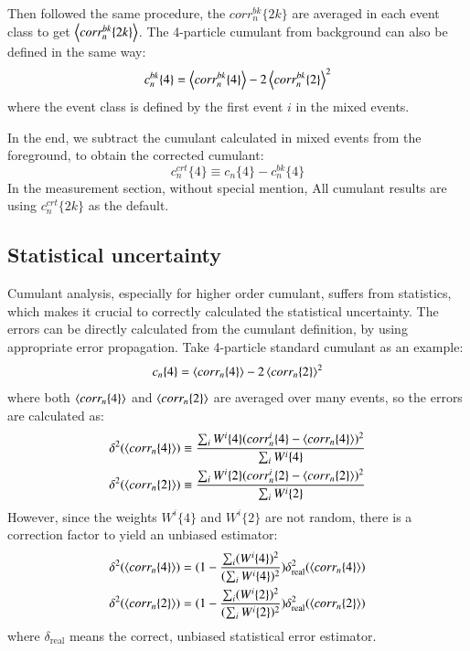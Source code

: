 Then followed the same procedure, the $corr_n^{bk}\{2k\}$ are averaged in each event class to get $\left\langle corr_n^{bk}\{2k\}\right\rangle$. The 4-particle cumulant from background can also be defined in the same way:
\begin{equation}
c_{n}^{bk}\{4\}=\left\langle corr_n^{bk}\{4\}\right\rangle-2\left\langle corr_n^{bk}\{2\}\right\rangle^2
\end{equation}
where the event class is defined by the first event $i$ in the mixed events.

In the end, we subtract the cumulant calculated in mixed events from the foreground, to obtain the corrected cumulant:
\begin{equation}
c_{n}^{crt}\{4\}\equiv c_{n}\{4\}-c_{n}^{bk}\{4\}
\end{equation}
In the measurement section, without special mention, All cumulant results are using $c_{n}^{crt}\{2k\}$ as the default.



\subsection{Statistical uncertainty}
Cumulant analysis, especially for higher order cumulant, suffers from statistics, which makes it crucial to correctly calculated the statistical uncertainty. The errors can be directly calculated from the cumulant definition, by using appropriate error propagation. Take 4-particle standard cumulant as an example:
\begin{equation}
c_n\{4\}=\left\langle corr_n\{4\}\right\rangle-2\left\langle corr_n\{2\}\right\rangle^2
\end{equation}
where both $\left\langle corr_n\{4\}\right\rangle$ and $\left\langle corr_n\{2\}\right\rangle$ are averaged over many events, so the errors are calculated as:
\begin{equation}
\begin{split}
\delta^2(\left\langle corr_n\{4\}\right\rangle)&\equiv \frac{\sum_i W^i\{4\}(corr_n^i\{4\}-\left\langle corr_n\{4\}\right\rangle)^2}{\sum_i W^i\{4\}} \\
\delta^2(\left\langle corr_n\{2\}\right\rangle)&\equiv \frac{\sum_i W^i\{2\}(corr_n^i\{2\}-\left\langle corr_n\{2\}\right\rangle)^2}{\sum_i W^i\{2\}}
\end{split}
\end{equation}
However, since the weights $W^i\{4\}$ and $W^i\{2\}$ are not random, there is a correction factor to yield an unbiased estimator:
\begin{equation}
\begin{split}
\delta^2(\left\langle corr_n\{4\}\right\rangle)&=(1-\frac{\sum_i (W^i\{4\})^2}{(\sum_i W^i\{4\})^2})\delta^2_\text{real}(\left\langle corr_n\{4\}\right\rangle) \\
\delta^2(\left\langle corr_n\{2\}\right\rangle)&=(1-\frac{\sum_i (W^i\{2\})^2}{(\sum_i W^i\{2\})^2})\delta^2_\text{real}(\left\langle corr_n\{2\}\right\rangle)
\end{split}
\end{equation}
where $\delta_\text{real}$ means the correct, unbiased statistical error estimator.

